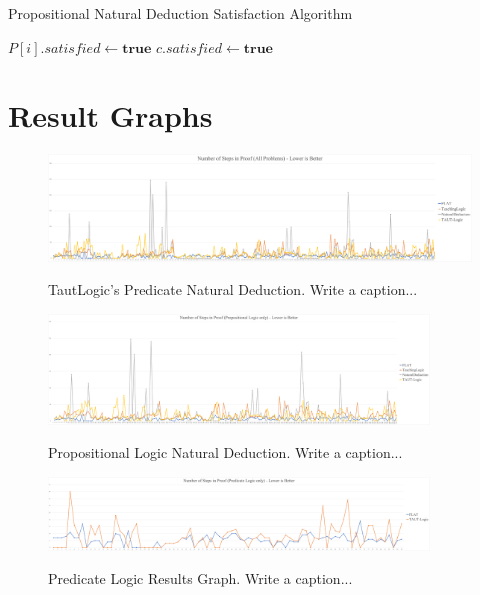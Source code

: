 \documentclass[ms]{uncgdissertationexp2}
\theoremstyle{plain}
\theoremstyle{definition}
\theoremstyle{remark}
\newcommand{\titlecaption}[2]{\caption[#1]{#1. #2}}
\begin{document}
\begin{algorithm}
	\caption{Propositional Natural Deduction Satisfaction Algorithm}\label{euclid}
	\label{appendix:algorithm}
	\begin{algorithmic}[1]
		\State $P[i].satisfied\gets{\textbf{true}}$
		\EndIf
		\EndFor
		\State $c.satisfied\gets{\textbf{true}}$
		\EndIf
		\EndWhile
		\EndProcedure
	\end{algorithmic}
\end{algorithm}

\chapter{Result Graphs}

\begin{figure}
	\centering
	\includegraphics[width=1\textwidth]{all-proofs-graph.png}
	\titlecaption{TautLogic's Predicate Natural Deduction}{Write a caption...}
	\label{fig:allproofsgraph}
\end{figure} 

\begin{figure}[ht]
	\centering
	\includegraphics[width=0.9\textwidth]{prop-graph.png}
	\titlecaption{Propositional Logic Natural Deduction}{Write a caption...}
	\label{fig:propgraph}
\end{figure} 

\begin{figure}[ht]
	\centering
	\includegraphics[width=0.9\textwidth]{pred-graph.png}
	\titlecaption{Predicate Logic Results Graph}{Write a caption...}
	\label{fig:predgraph}
\end{figure} 

\backmatter
\end{document}
